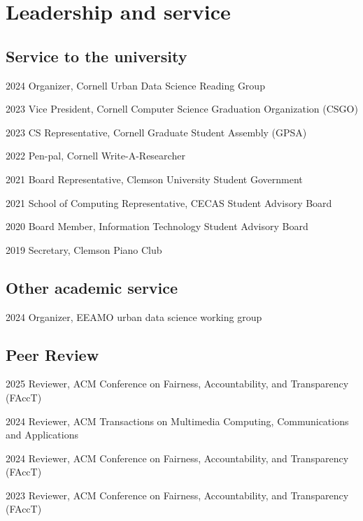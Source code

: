 \documentclass[11pt,letterpaper]{report}
\begin{document}
    \clearpage
    \section*{Leadership and service}
    \subsection*{Service to the university}
    \begin{tablist} 
        \item[2024] \tab{}Organizer, Cornell Urban Data Science Reading Group 
        \item[2023] \tab{}Vice President, Cornell Computer Science Graduation Organization (CSGO)
        \item[2023] \tab{}CS Representative, Cornell Graduate Student Assembly (GPSA)
        \item[2022] \tab{}Pen-pal, Cornell Write-A-Researcher
        \item[2021] \tab{}Board Representative, Clemson University Student Government 
        \item[2021] \tab{}School of Computing Representative, CECAS Student Advisory Board 
        \item[2020] \tab{}Board Member, Information Technology Student Advisory Board
        \item[2019] \tab{}Secretary, Clemson Piano Club 
    \end{tablist} 

    \subsection*{Other academic service}
    \begin{tablist}
        \item[2024] \tab{}Organizer, EEAMO urban data science working group
    \end{tablist}

    \subsection*{Peer Review} 

    \begin{tablist} 
        \item[2025] \tab{}Reviewer, ACM Conference on Fairness, Accountability, and Transparency (FAccT)
        \item[2024] \tab{}Reviewer, ACM Transactions on Multimedia Computing, Communications and Applications
        \item[2024] \tab{}Reviewer, ACM Conference on Fairness, Accountability, and Transparency (FAccT)
        \item[2023] \tab{}Reviewer, ACM Conference on Fairness, Accountability, and Transparency (FAccT)
    
    \end{tablist}
\end{document}

